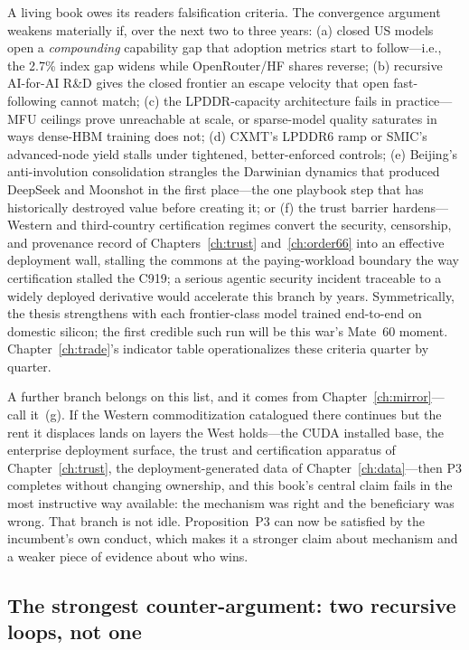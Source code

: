 A living book owes its readers falsification criteria. The convergence argument weakens materially if, over the next two to three years: (a) closed US models open a \emph{compounding} capability gap that adoption metrics start to follow---i.e., the 2.7\% index gap widens while OpenRouter/HF shares reverse; (b) recursive AI-for-AI R\&D gives the closed frontier an escape velocity that open fast-following cannot match; (c) the LPDDR-capacity architecture fails in practice---MFU ceilings prove unreachable at scale, or sparse-model quality saturates in ways dense-HBM training does not; (d) CXMT's LPDDR6 ramp or SMIC's advanced-node yield stalls under tightened, better-enforced controls; (e) Beijing's anti-involution consolidation strangles the Darwinian dynamics that produced DeepSeek and Moonshot in the first place---the one playbook step that has historically destroyed value before creating it; or (f) the trust barrier hardens---Western and third-country certification regimes convert the security, censorship, and provenance record of Chapters~\ref{ch:trust} and~\ref{ch:order66} into an effective deployment wall, stalling the commons at the paying-workload boundary the way certification stalled the C919; a serious agentic security incident traceable to a widely deployed derivative would accelerate this branch by years. Symmetrically, the thesis strengthens with each frontier-class model trained end-to-end on domestic silicon; the first credible such run will be this war's Mate~60 moment. Chapter~\ref{ch:trade}'s indicator table operationalizes these criteria quarter by quarter.

A further branch belongs on this list, and it comes from Chapter~\ref{ch:mirror}---call it~(g). If the Western commoditization catalogued there continues but the rent it displaces lands on layers the West holds---the CUDA installed base, the enterprise deployment surface, the trust and certification apparatus of Chapter~\ref{ch:trust}, the deployment-generated data of Chapter~\ref{ch:data}---then P3 completes without changing ownership, and this book's central claim fails in the most instructive way available: the mechanism was right and the beneficiary was wrong. That branch is not idle. Proposition~P3 can now be satisfied by the incumbent's own conduct, which makes it a stronger claim about mechanism and a weaker piece of evidence about who wins.

\subsection{The strongest counter-argument: two recursive loops, not one}
\label{sec:rsi-branch}

